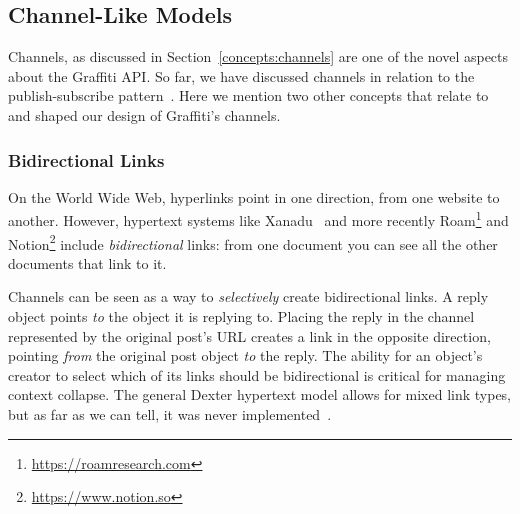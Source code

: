 \subsection{Channel-Like Models}

Channels, as discussed in Section~\ref{concepts:channels}
are one of the novel aspects about the Graffiti API.
So far, we have discussed channels in relation to the publish-subscribe
pattern~\cite{pubsub}.
Here we mention two other concepts that relate to and shaped our
design of Graffiti's channels.








\subsubsection{Bidirectional Links}

On the World Wide Web, hyperlinks point in one direction, from one website to another.
However, hypertext systems like Xanadu~\cite{xanadu}
and more recently Roam\footnote{\url{https://roamresearch.com}}
and Notion\footnote{\url{https://www.notion.so}}
include \emph{bidirectional} links:
from one document you can see all the other documents that link to it.

Channels can be seen as a way to \emph{selectively} create bidirectional links.
A reply object points \emph{to} the object it is replying to.
Placing the reply in the channel represented by the original post's URL
creates a link in the opposite direction,
pointing \emph{from} the original post object \emph{to} the reply.
The ability for an object's creator to select which of its links should be bidirectional
is critical for managing context collapse.
The general Dexter hypertext model allows for mixed link types, but
as far as we can tell, it was never implemented~\cite{dexter}.

